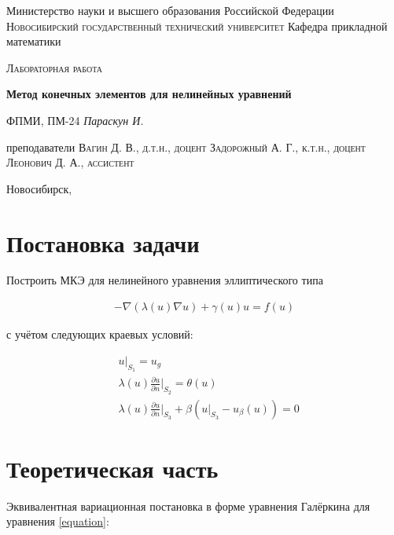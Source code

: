 \documentclass[12pt]{article}
\begin{document}
\begin{titlepage}
\centering

{Министерство науки и высшего образования Российской Федерации}
\vskip 2mm
{\large\scshape Новосибирский государственный технический университет}
\vskip 2mm
{Кафедра прикладной математики}

\vfill
\vskip 3cm

{\scshape Лабораторная работа}
\vskip 3mm
\begin{spacing}{1.7}
    {\huge\bf Метод конечных элементов для нелинейных уравнений}
\end{spacing}
\vskip 5mm
{\scriptsize ФПМИ, ПМ-24}
\vskip 2mm
{\large\it Параскун И.}

\vfill

{преподаватели}
\vskip 2mm
{\scshape Вагин Д. В., д.т.н., доцент}
\vskip 1mm
{\scshape Задорожный А. Г., к.т.н., доцент}
\vskip 1mm
{\scshape Леонович Д. А., ассистент}

\vfill

{Новосибирск, \the\year}

\end{titlepage}

\setcounter{page}{2}

\section{Постановка задачи}

\noindent Построить МКЭ для нелинейного уравнения эллиптического типа

\begin{align}
  \label{equation} -\nabla(\lambda(u)\nabla u) + \gamma (u) u = f(u)
\end{align}

\vskip 2mm
\noindent с учётом следующих краевых условий:

\begin{align}
  &u \big|_{S_1} = u_g \\
  &\lambda(u)\frac{\partial u}{\partial n} \big|_{S_2} = \theta(u) \\
  &\lambda(u)\frac{\partial u}{\partial n} \big|_{S_3} +
    \beta(u \big|_{S_3} - u_{\beta}(u)) = 0
\end{align}

\section{Теоретическая часть}

\noindent Эквивалентная вариационная постановка в форме уравнения Галёркина для
уравнения \ref{equation}:
\end{document}
